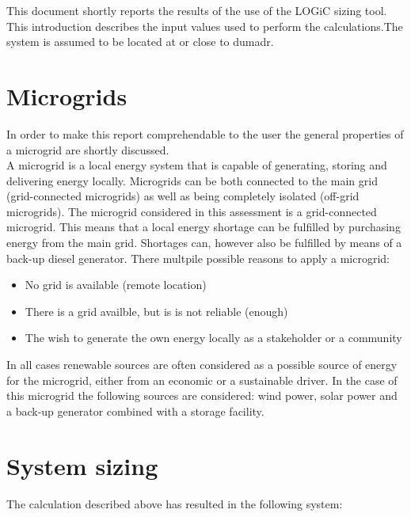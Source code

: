 \documentclass{article}
\begin{document}
\begin{multicols*}{2}

This document shortly reports the results of the use of the LOGiC sizing tool. This introduction describes the input values used to perform the calculations.The system is assumed to be located at or close to dumadr.

\section*{Microgrids}

In order to make this report comprehendable to the user the general properties of a microgrid are shortly discussed.\\ A microgrid is a local energy system that is capable of generating, storing and delivering energy locally. Microgrids can be both connected to the main grid (grid-connected microgrids) as well as being completely isolated (off-grid microgrids). The microgrid considered in this assessment is a grid-connected microgrid. This means that a local energy shortage can be fulfilled by purchasing energy from the main grid. Shortages can, however also be fulfilled by means of a back-up diesel generator. There multpile possible reasons to apply a microgrid: \begin{itemize}

 \item No grid is available (remote location) 

\item There is a grid availble, but is is not reliable (enough)  

\item The wish to generate the own energy locally as a stakeholder or a community 

\end{itemize}

In all cases renewable sources are often considered as a possible source of energy for the microgrid, either from an economic or a sustainable driver. In the case of this microgrid the following sources are considered: wind power, solar power and a back-up generator combined with a storage facility.

\section*{System sizing}

The calculation described above has resulted in the following system:


\end{multicols*}
\end{document}
